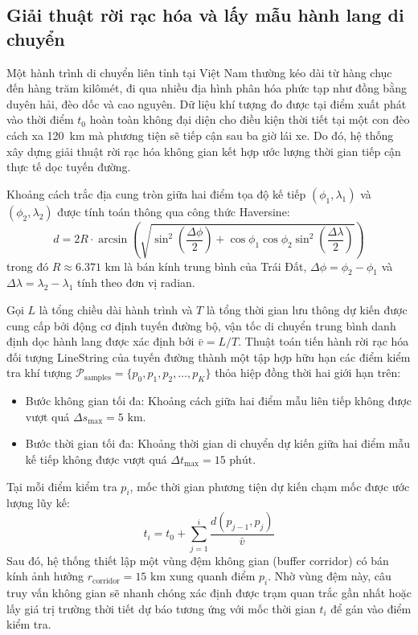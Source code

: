 \subsection{Giải thuật rời rạc hóa và lấy mẫu hành lang di chuyển}

Một hành trình di chuyển liên tỉnh tại Việt Nam thường kéo dài từ hàng chục đến hàng trăm kilômét, đi qua nhiều địa hình phân hóa phức tạp như đồng bằng duyên hải, đèo dốc và cao nguyên. Dữ liệu khí tượng đo được tại điểm xuất phát vào thời điểm $t_0$ hoàn toàn không đại diện cho điều kiện thời tiết tại một con đèo cách xa 120~km mà phương tiện sẽ tiếp cận sau ba giờ lái xe. Do đó, hệ thống xây dựng giải thuật rời rạc hóa không gian kết hợp ước lượng thời gian tiếp cận thực tế dọc tuyến đường.

Khoảng cách trắc địa cung tròn giữa hai điểm tọa độ kế tiếp $(\phi_1, \lambda_1)$ và $(\phi_2, \lambda_2)$ được tính toán thông qua công thức Haversine:
\begin{equation}
\label{eq:haversine_vi}
d = 2R \cdot \arcsin \left( \sqrt{\sin^2\left(\frac{\Delta \phi}{2}\right) + \cos\phi_1 \cos\phi_2 \sin^2\left(\frac{\Delta \lambda}{2}\right)} \right)
\end{equation}
trong đó $R \approx 6.371\text{ km}$ là bán kính trung bình của Trái Đất, $\Delta \phi = \phi_2 - \phi_1$ và $\Delta \lambda = \lambda_2 - \lambda_1$ tính theo đơn vị radian.

Gọi $L$ là tổng chiều dài hành trình và $T$ là tổng thời gian lưu thông dự kiến được cung cấp bởi động cơ định tuyến đường bộ, vận tốc di chuyển trung bình danh định dọc hành lang được xác định bởi $\bar{v} = L / T$. Thuật toán tiến hành rời rạc hóa đối tượng LineString của tuyến đường thành một tập hợp hữu hạn các điểm kiểm tra khí tượng $\mathcal{P}_{\text{samples}} = \{p_0, p_1, p_2, \dots, p_K\}$ thỏa hiệp đồng thời hai giới hạn trên:
\begin{itemize}
    \item[-] Bước không gian tối đa: Khoảng cách giữa hai điểm mẫu liên tiếp không được vượt quá $\Delta s_{\max} = 5\text{ km}$.
    \item[-] Bước thời gian tối đa: Khoảng thời gian di chuyển dự kiến giữa hai điểm mẫu kế tiếp không được vượt quá $\Delta t_{\max} = 15\text{ phút}$.
\end{itemize}

Tại mỗi điểm kiểm tra $p_i$, mốc thời gian phương tiện dự kiến chạm mốc được ước lượng lũy kế:
\begin{equation}
\label{eq:arrival_time_vi}
t_i = t_0 + \sum_{j=1}^{i} \frac{d(p_{j-1}, p_j)}{\bar{v}}
\end{equation}
Sau đó, hệ thống thiết lập một vùng đệm không gian (buffer corridor) có bán kính ảnh hưởng $r_{\text{corridor}} = 15\text{ km}$ xung quanh điểm $p_i$. Nhờ vùng đệm này, câu truy vấn không gian sẽ nhanh chóng xác định được trạm quan trắc gần nhất hoặc lấy giá trị trường thời tiết dự báo tương ứng với mốc thời gian $t_i$ để gán vào điểm kiểm tra.

